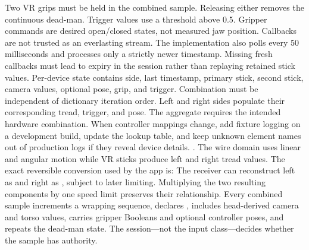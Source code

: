 {}Two VR grips must be held in the combined sample. Releasing either removes the continuous dead-man. Trigger values use a threshold above 0.5. Gripper commands are desired open/closed states, not measured jaw position.\markdownRendererParagraphSeparator
{}Callbacks are not trusted as an everlasting stream. The implementation also polls  every 50 milliseconds and processes only a strictly newer timestamp. Missing fresh callbacks must lead to expiry in the session rather than replaying retained stick values.\markdownRendererInterblockSeparator
{}\markdownRendererSectionBegin
{}\markdownRendererInterblockSeparator
{}Per-device state contains side, last timestamp, primary stick, second stick, camera values, optional pose, grip, and trigger. Combination must be independent of dictionary iteration order. Left and right sides populate their corresponding tread, trigger, and pose. The aggregate  requires the intended hardware combination.\markdownRendererParagraphSeparator
{}When controller mappings change, add fixture logging on a development build, update the lookup table, and keep unknown element names out of production logs if they reveal device details.\markdownRendererInterblockSeparator
{}
\markdownRendererSectionEnd 
\markdownRendererSectionEnd \markdownRendererSectionBegin
{}\markdownRendererInterblockSeparator
{}\markdownRendererBlockQuoteBegin
{} .\markdownRendererBlockQuoteEnd \markdownRendererInterblockSeparator
{}The wire domain uses linear and angular motion while VR sticks produce left and right tread values. The exact reversible conversion used by the app is:\markdownRendererInterblockSeparator
{}\markdownRendererInterblockSeparator
{}The receiver can reconstruct left as  and right as , subject to later limiting. Multiplying the two resulting components by one speed limit preserves their relationship.\markdownRendererParagraphSeparator
{}Every combined sample increments a wrapping  sequence, declares , includes head-derived camera and torso values, carries gripper Booleans and optional controller poses, and repeats the dead-man state. The session—not the input class—decides whether the sample has authority.\markdownRendererInterblockSeparator

